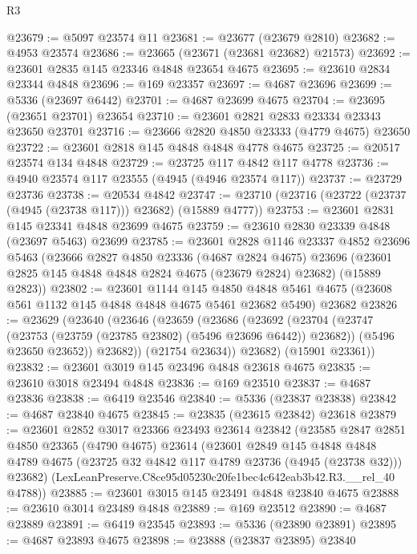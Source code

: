 \begin{lexlean}{R3}
\begin{coremodule}
@23679 := @5097 @23574 @11
@23681 := @23677 (@23679 @2810)
@23682 := @4953 @23574
@23686 := @23665 (@23671 (@23681 @23682) @21573)
@23692 := @23601 @2835 @145 @23346 @4848 @23654 @4675
@23695 := @23610 @2834 @23344 @4848
@23696 := @169 @23357
@23697 := @4687 @23696
@23699 := @5336 (@23697 @6442)
@23701 := @4687 @23699 @4675
@23704 := @23695 (@23651 @23701) @23654
@23710 := @23601 @2821 @2833 @23334 @23343 @23650 @23701
@23716 := @23666 @2820 @4850 @23333 (@4779 @4675) @23650
@23722 := @23601 @2818 @145 @4848 @4848 @4778 @4675
@23725 := @20517 @23574 @134 @4848
@23729 := @23725 @117 @4842 @117 @4778
@23736 := @4940 @23574 @117 @23555 (@4945 (@4946 @23574 @117))
@23737 := @23729 @23736
@23738 := @20534 @4842
@23747 := @23710 (@23716 (@23722 (@23737 (@4945 (@23738 @117))) @23682) (@15889 @4777))
@23753 := @23601 @2831 @145 @23341 @4848 @23699 @4675
@23759 := @23610 @2830 @23339 @4848 (@23697 @5463) @23699
@23785 := @23601
    @2828
    @1146
    @23337
    @4852
    @23696
    @5463
    (@23666
      @2827
      @4850
      @23336
      (@4687 @2824 @4675)
      @23696
      (@23601 @2825 @145 @4848 @4848 @2824 @4675 (@23679 @2824) @23682)
      (@15889 @2823))
@23802 := @23601
    @1144
    @145
    @4850
    @4848
    @5461
    @4675
    (@23608 @561 @1132 @145 @4848 @4848 @4675 @5461 @23682 @5490)
    @23682
@23826 := @23629
    (@23640
      (@23646
        (@23659
          (@23686
            (@23692
              (@23704
                (@23747 (@23753 (@23759 (@23785 @23802) (@5496 @23696 @6442)) @23682))
                (@5496 @23650 @23652))
              @23682))
          (@21754 @23634))
        @23682)
      (@15901 @23361))
@23832 := @23601 @3019 @145 @23496 @4848 @23618 @4675
@23835 := @23610 @3018 @23494 @4848
@23836 := @169 @23510
@23837 := @4687 @23836
@23838 := @6419 @23546
@23840 := @5336 (@23837 @23838)
@23842 := @4687 @23840 @4675
@23845 := @23835 (@23615 @23842) @23618
@23879 := @23601
    @2852
    @3017
    @23366
    @23493
    @23614
    @23842
    (@23585
      @2847
      @2851
      @4850
      @23365
      (@4790 @4675)
      @23614
      (@23601
        @2849
        @145
        @4848
        @4848
        @4789
        @4675
        (@23725 @32 @4842 @117 @4789 @23736 (@4945 (@23738 @32)))
        @23682)
      (LexLeanPreserve.C8ce95d05230c20fe1bec4c642eab3b42.R3.__rel_40 @4788))
@23885 := @23601 @3015 @145 @23491 @4848 @23840 @4675
@23888 := @23610 @3014 @23489 @4848
@23889 := @169 @23512
@23890 := @4687 @23889
@23891 := @6419 @23545
@23893 := @5336 (@23890 @23891)
@23895 := @4687 @23893 @4675
@23898 := @23888 (@23837 @23895) @23840

\end{coremodule}
\end{lexlean}
